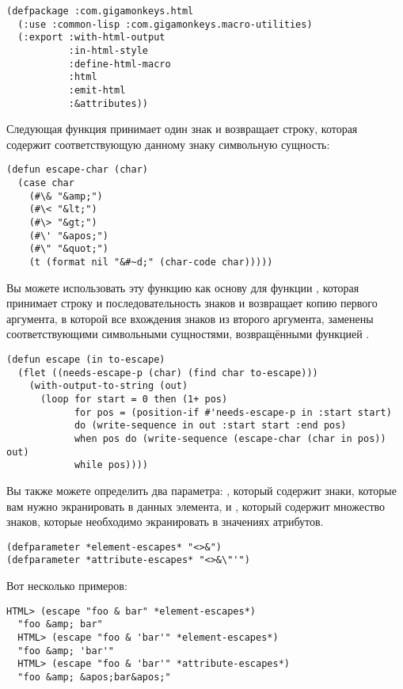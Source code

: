 \begin{lstlisting}
(defpackage :com.gigamonkeys.html
  (:use :common-lisp :com.gigamonkeys.macro-utilities)
  (:export :with-html-output
           :in-html-style
           :define-html-macro
           :html
           :emit-html
           :&attributes))
\end{lstlisting}


Следующая функция принимает один знак и возвращает строку, которая содержит
соответствующую данному знаку символьную сущность:

\begin{lstlisting}
(defun escape-char (char)
  (case char
    (#\& "&amp;")
    (#\< "&lt;")
    (#\> "&gt;")
    (#\' "&apos;")
    (#\" "&quot;")
    (t (format nil "&#~d;" (char-code char)))))
\end{lstlisting}

Вы можете использовать эту функцию как основу для функции , которая принимает
строку и последовательность знаков и возвращает копию первого аргумента, в которой все
вхождения знаков из второго аргумента, заменены соответствующими символьными сущностями,
возвращёнными функцией .

\begin{lstlisting}
(defun escape (in to-escape)
  (flet ((needs-escape-p (char) (find char to-escape)))
    (with-output-to-string (out)
      (loop for start = 0 then (1+ pos)
            for pos = (position-if #'needs-escape-p in :start start)
            do (write-sequence in out :start start :end pos)
            when pos do (write-sequence (escape-char (char in pos)) out)
            while pos))))
\end{lstlisting}

Вы также можете определить два параметра: , который содержит
знаки, которые вам нужно экранировать в данных элемента, и ,
который содержит множество знаков, которые необходимо экранировать в значениях атрибутов.

\begin{lstlisting}
(defparameter *element-escapes* "<>&")
(defparameter *attribute-escapes* "<>&\"'")
\end{lstlisting}

Вот несколько примеров:

\begin{lstlisting}[style=lisprepl]
  HTML> (escape "foo & bar" *element-escapes*)
  "foo &amp; bar"
  HTML> (escape "foo & 'bar'" *element-escapes*)
  "foo &amp; 'bar'"
  HTML> (escape "foo & 'bar'" *attribute-escapes*)
  "foo &amp; &apos;bar&apos;"
\end{lstlisting}

